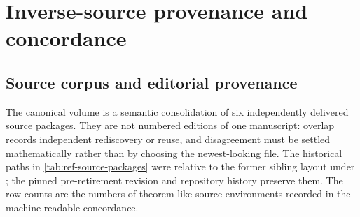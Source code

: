 \chapter{Inverse-source provenance and concordance}
\label{chap:inverse-reference-appendix}

\section{Source corpus and editorial provenance}
\label{sec:ref-source-provenance}

The canonical volume is a semantic consolidation of six independently
delivered source packages.  They are not numbered editions of one manuscript:
overlap records independent rediscovery or reuse, and disagreement must be
settled mathematically rather than by choosing the newest-looking file.  The
historical paths in \cref{tab:ref-source-packages} were relative to the former
sibling layout under ; the pinned pre-retirement
revision and repository history preserve them.  The row counts are the
numbers of theorem-like source environments recorded in the machine-readable
concordance.

